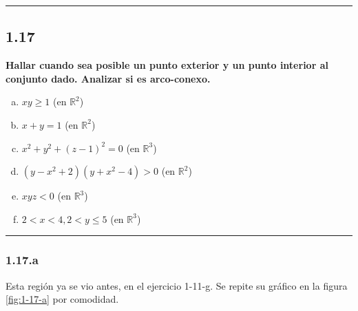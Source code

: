 \documentclass{article}
\renewcommand{\Bbb}{\mathbb}
\begin{document}
\hrule
\vspace{10 pt}

\subsection*{1.17}
\label{subsec:1.17}

\textbf{Hallar cuando sea posible un punto exterior y un punto interior al conjunto dado. Analizar si es arco-conexo.} 

\begin{enumerate}[(a)]
\bfseries
\item $xy \geq 1$ (en $\Bbb R^2$)

\item $x + y = 1$ (en $\Bbb R^2$)

\item $x^2 + y^2 + (z-1)^2 = 0$ (en $\Bbb R^3$)

\item $(y - x^2 + 2) (y + x^2 -4) > 0$ (en $\Bbb R^2$)

\item $xyz < 0$ (en $\Bbb R^3$)

\item $2 < x <4, 2 < y \leq 5$ (en $\Bbb R^3$)
\end{enumerate}
\hrule

\subsubsection*{1.17.a}
\label{subsubsec:1.17.a}

Esta región ya se vio antes, en el ejercicio 1-11-g. Se repite su gráfico en la figura \ref{fig:1-17-a} por comodidad.
\end{document}
